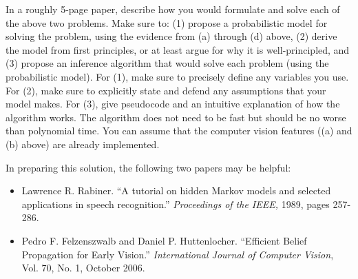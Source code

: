 \documentclass[11pt]{article}
\begin{document}
\begin{appendices}
\begin{enumerate}
In a roughly 5-page paper, describe how you would formulate and solve
each of the above two problems. Make sure to: (1) propose a probabilistic
model for solving the problem, using the evidence from (a) through (d)
above, (2) derive the model from first
principles, or at least argue for why it is well-principled, and (3)
propose an inference algorithm that would solve each problem (using
the probabilistic model).  For (1), make sure to precisely define any
variables you use.
For (2), make sure to explicitly state and defend any assumptions that
your model makes.
 For (3), give pseudocode and an intuitive
explanation of how the algorithm works. The algorithm does not need to
be fast but should be no worse than polynomial time.  You can assume
that the computer vision features ((a) and (b) above) are already
implemented.


In preparing this solution, the following two papers may be helpful:

\begin{itemize}
\item  Lawrence R. Rabiner. ``A  tutorial on hidden Markov models and
selected applications in speech recognition.'' \textit{Proceedings of
the IEEE,} 1989, pages 257-286.
\item Pedro F. Felzenszwalb and Daniel P. Huttenlocher. ``Efficient
Belief Propagation for Early Vision.''
\textit{International Journal of Computer Vision}, Vol. 70, No. 1, October 2006.
\end{itemize}


\end{enumerate}



\end{appendices}
\end{document}
